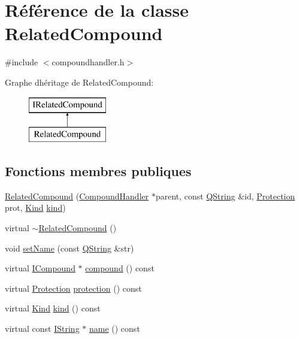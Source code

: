 \hypertarget{class_related_compound}{}\section{Référence de la classe Related\+Compound}
\label{class_related_compound}


{\ttfamily \#include $<$compoundhandler.\+h$>$}

Graphe d\textquotesingle{}héritage de Related\+Compound\+:\begin{figure}[H]
\begin{center}
\leavevmode
\includegraphics[height=2.000000cm]{class_related_compound}
\end{center}
\end{figure}
\subsection*{Fonctions membres publiques}
\begin{DoxyCompactItemize}
\item 
\hyperlink{class_related_compound_a58f1b264c47bf2099fa167abede914d6}{Related\+Compound} (\hyperlink{class_compound_handler}{Compound\+Handler} $\ast$parent, const \hyperlink{class_q_string}{Q\+String} \&id, \hyperlink{types_8h_a90e352184df58cd09455fe9996cd4ded}{Protection} prot, \hyperlink{class_i_related_compound_a70abfb2e64571aa06b83bd7da0888363}{Kind} \hyperlink{class_related_compound_a0a30d0b3c01f27b71889014363b5aaac}{kind})
\item 
virtual \hyperlink{class_related_compound_a6d6a3d76e7d3f0db7acb8c9f8597dea7}{$\sim$\+Related\+Compound} ()
\item 
void \hyperlink{class_related_compound_a0eff6a37dfd17a90922930df2947ba60}{set\+Name} (const \hyperlink{class_q_string}{Q\+String} \&str)
\item 
virtual \hyperlink{class_i_compound}{I\+Compound} $\ast$ \hyperlink{class_related_compound_a333bc580364546ea4ee2703f067db556}{compound} () const 
\item 
virtual \hyperlink{types_8h_a90e352184df58cd09455fe9996cd4ded}{Protection} \hyperlink{class_related_compound_a81fa9120ac2bc347b51cba6ad3bae95f}{protection} () const 
\item 
virtual \hyperlink{class_i_related_compound_a70abfb2e64571aa06b83bd7da0888363}{Kind} \hyperlink{class_related_compound_a0a30d0b3c01f27b71889014363b5aaac}{kind} () const 
\item 
virtual const \hyperlink{class_i_string}{I\+String} $\ast$ \hyperlink{class_related_compound_a27ab559ab1aa0a8738a4486941260699}{name} () const 
\end{DoxyCompactItemize}
